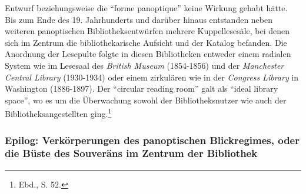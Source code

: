 Entwurf beziehungsweise die \enquote{forme panoptique} keine Wirkung
gehabt hätte. Bis zum Ende des 19. Jahrhunderts und darüber hinaus
entstanden neben weiteren panoptischen Bibliotheksentwürfen mehrere
Kuppellesesäle, bei denen sich im Zentrum die bibliothekarische Aufsicht
und der Katalog befanden. Die Anordnung der Lesepulte folgte in diesen
Bibliotheken entweder einem radialen System wie im Lesesaal des
\emph{British Museum} (1854-1856) und der \emph{Manchester Central
Library} (1930-1934) oder einem zirkulären wie in der \emph{Congress
Library} in Washington (1886-1897). Der \enquote{circular reading room}
galt als \enquote{ideal library space}, wo es um die Überwachung sowohl
der Bibliotheksnutzer wie auch der Bibliotheksangestellten
ging.\footnote{Ebd., S. 52.}

\subsubsection{Epilog: Verkörperungen des panoptischen Blickregimes,
oder die Büste des Souveräns im Zentrum der
Bibliothek}\label{epilog-verkuxf6rperungen-des-panoptischen-blickregimes-oder-die-buxfcste-des-souveruxe4ns-im-zentrum-der-bibliothek}

